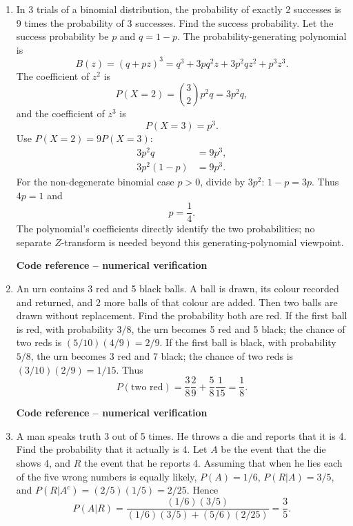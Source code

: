 \begin{enumerate}[label={},leftmargin=0pt,itemsep=9pt]
\item[\textbf{1.2.56}] In 3 trials of a binomial distribution, the probability of exactly 2 successes is 9 times the probability of 3 successes. Find the success probability.
\solution Let the success probability be $p$ and $q=1-p$. The probability-generating polynomial is
\[
B(z)=(q+pz)^3=q^3+3pq^2z+3p^2qz^2+p^3z^3.
\]
The coefficient of $z^2$ is
\[
P(X=2)=\binom32p^2q=3p^2q,
\]
and the coefficient of $z^3$ is
\[
P(X=3)=p^3.
\]
Use $P(X=2)=9P(X=3)$:
\begin{align*}
3p^2q&=9p^3,\\
3p^2(1-p)&=9p^3.
\end{align*}
For the non-degenerate binomial case $p>0$, divide by $3p^2$: $1-p=3p$. Thus $4p=1$ and
\[
p=\frac14.
\]
The polynomial's coefficients directly identify the two probabilities; no separate $Z$-transform is needed beyond this generating-polynomial viewpoint.
\par\smallskip
\noindent\textbf{Code reference -- numerical verification}
\par\noindent{}
\par\smallskip

\item[\textbf{1.2.57}] An urn contains 3 red and 5 black balls. A ball is drawn, its colour recorded and returned, and 2 more balls of that colour are added. Then two balls are drawn without replacement. Find the probability both are red.
\solution If the first ball is red, with probability $3/8$, the urn becomes 5 red and 5 black; the chance of two reds is $(5/10)(4/9)=2/9$. If the first ball is black, with probability $5/8$, the urn becomes 3 red and 7 black; the chance of two reds is $(3/10)(2/9)=1/15$. Thus
\[
P(\text{two red})=\frac38\frac29+\frac58\frac1{15}=\frac18.
\]
\par\smallskip
\noindent\textbf{Code reference -- numerical verification}
\par\noindent{}
\par\smallskip

\item[\textbf{1.2.58}] A man speaks truth 3 out of 5 times. He throws a die and reports that it is 4. Find the probability that it actually is 4.
\solution Let $A$ be the event that the die shows 4, and $R$ the event that he reports 4. Assuming that when he lies each of the five wrong numbers is equally likely, $P(A)=1/6$, $P(R|A)=3/5$, and $P(R|A^c)=(2/5)(1/5)=2/25$. Hence
\[
P(A|R)=\frac{(1/6)(3/5)}{(1/6)(3/5)+(5/6)(2/25)}=\frac35.
\]
\end{enumerate}

